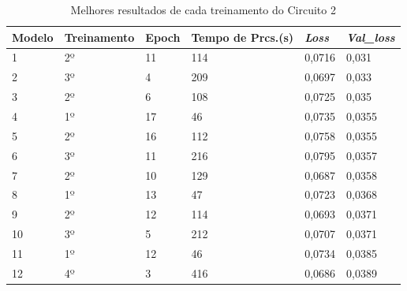 \begin{table}[H]
\centering
\caption{Melhores resultados de cada treinamento do Circuito 2}
\label{tabela3}
\begin{tabular}{|l|l|l|l|l|l|}
\hline
\textbf{Modelo} & \textbf{Treinamento} & \textbf{Epoch} & \textbf{Tempo de Prcs.(s)} & \textit{\textbf{Loss}} & \textit{\textbf{Val\_loss}} \\ \hline
1                   & 2º                   & 11             & 114                        & 0,0716                 & 0,031                       \\
2                   & 3º                   & 4              & 209                        & 0,0697                 & 0,033                       \\
3                   & 2º                   & 6              & 108                        & 0,0725                 & 0,035                       \\
4                   & 1º                   & 17             & 46                         & 0,0735                 & 0,0355                      \\
5                   & 2º                   & 16             & 112                        & 0,0758                 & 0,0355                      \\
6                   & 3º                   & 11             & 216                        & 0,0795                 & 0,0357                      \\
7                   & 2º                   & 10             & 129                        & 0,0687                 & 0,0358                      \\
8                   & 1º                   & 13             & 47                         & 0,0723                 & 0,0368                      \\
9                   & 2º                   & 12             & 114                        & 0,0693                 & 0,0371                      \\
10                   & 3º                   & 5              & 212                        & 0,0707                 & 0,0371                      \\
11                   & 1º                   & 12             & 46                         & 0,0734                 & 0,0385                      \\
12                   & 4º                   & 3              & 416                        & 0,0686                 & 0,0389                      \\

\end{tabular}
\end{table}
